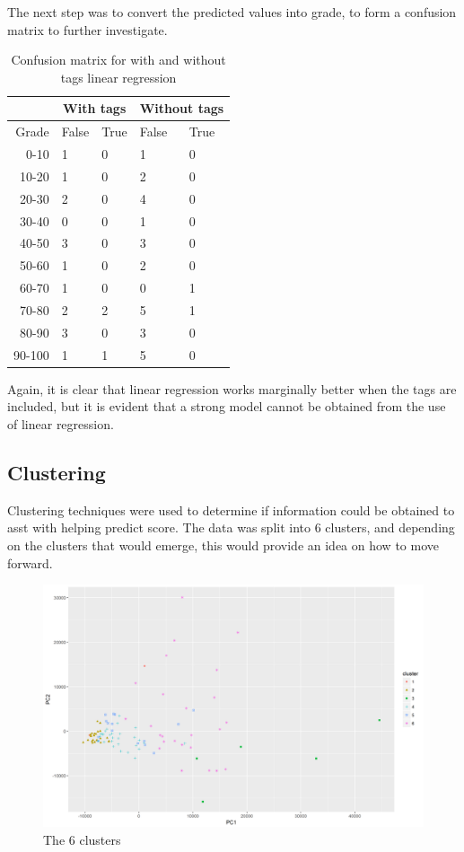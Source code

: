 \documentclass[models.tex]{subfiles}
\begin{document}
The next step was to convert the predicted values into grade, to form a
confusion matrix to further investigate.

\begin{table}[H]
    \centering
    \begin{tabular}{| r | l | l | l | l |}
    \hline
    & \multicolumn{2}{c|}{\textbf{With tags}} &
    \multicolumn{2}{c|}{\textbf{Without tags}} \\
    \hline
    Grade & False & True & False & True \\
    \hline
    0-10 & 1 & 0 & 1 & 0 \\
    10-20 & 1 & 0 & 2 & 0 \\
    20-30 & 2 & 0 & 4 & 0 \\
    30-40 & 0 & 0 & 1 & 0 \\
    40-50 & 3 & 0 & 3 & 0 \\
    50-60 & 1 & 0 & 2 & 0 \\
    60-70 & 1 & 0 & 0 & 1 \\
    70-80 & 2 & 2 & 5 & 1 \\
    80-90 & 3 & 0 & 3 & 0 \\
    90-100 & 1 & 1 & 5 & 0 \\
    \hline
    \end{tabular}
    \caption{Confusion matrix for with and without tags linear regression}
\end{table}

Again, it is clear that linear regression works marginally better when the tags
are included, but it is evident that a strong model cannot be obtained from the
use of linear regression.

\subsection{Clustering} %
\label{sub:clustering}
Clustering techniques were used to determine if information could be obtained
to asst with helping predict score. The data was split into 6 clusters, and
depending on the clusters that would emerge, this would provide an idea on how
to move forward.

\begin{figure}[H]
    \centering
    \includegraphics[width=\textwidth]{img/clust_plot.png}
    \caption{The 6 clusters}
\end{figure}
\end{document}
